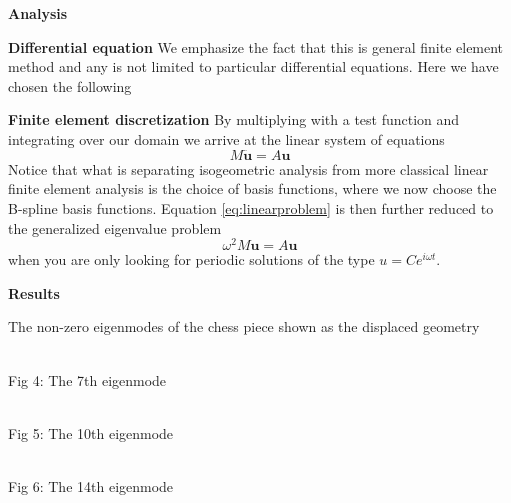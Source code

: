 \documentclass[portrait,a0b,final]{a0poster}
\newenvironment{poster}{
  \begin{center}
  \begin{minipage}[c]{0.98\textwidth}
}{
  \end{minipage} 
  \end{center}
}
\newcommand{\pbox}[4]{
\psshadowbox[#3]{
\begin{minipage}[t][#2][t]{#1}
#4
\end{minipage}
}}
\begin{document}
\begin{poster}
\begin{multicols}{3}
	\vspace{2cm}

    \begin{center}{\huge{\bf Analysis}}
    \end{center}
	\Large
	{\bf Differential equation}
	We emphasize the fact that this is general finite element method and any is not limited to particular differential equations. Here we have chosen the following \\
   	\pbox{\columnwidth-\columnsep}{5.2cm}{linewidth=2mm,framearc=0.1,linecolor=whiteblue,fillstyle=gradient,gradangle=0,gradbegin=whiteblue,gradend=whiteblue,gradmidpoint=1.0,framesep=1em,shadowsize=10pt}{
		{\bf Model problem} Free vibration
		\[
			\rho \frac{\partial^2 \mathbf{u}}{\partial t^2} = \nabla \sigma (\mathbf{u})
		\]
	}
	\newline

	\vspace{2cm}

	{\bf Finite element discretization} By multiplying with a test function and integrating over our domain we arrive at the linear system of equations
	\begin{equation}
	\label{eq:linearproblem}
		M\ddot{\mathbf{u}} = A\mathbf{u}
	\end{equation}
	Notice that what is separating isogeometric analysis from more classical linear finite element analysis is the choice of basis functions, where we now choose the B-spline basis functions.
	Equation \eqref{eq:linearproblem} is then further reduced to the generalized eigenvalue problem
	\begin{equation*}
		\omega^2M{\mathbf{u}} = A\mathbf{u}
	\end{equation*}
	when you are only looking for periodic solutions of the type $u=Ce^{i\omega t}$.

	\vspace{2cm}

    \begin{center} {\huge{\bf Results}} \end{center}
	\Large
		The non-zero eigenmodes of the chess piece shown as the displaced geometry
		\begin{center}
			 \\
			\normalsize{Fig 4: The 7th eigenmode}
		\end{center}
		\begin{center}
			 \\
			\normalsize{Fig 5: The 10th eigenmode}
		\end{center}
		\begin{center}
			 \\
			\normalsize{Fig 6: The 14th eigenmode}
		\end{center}


\end{multicols}
\end{poster}
\end{document}
